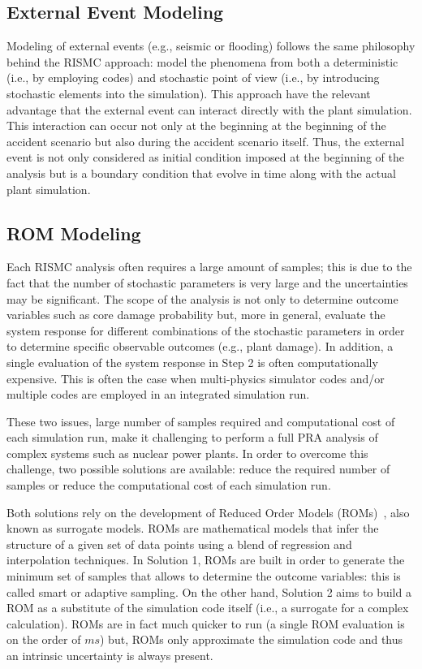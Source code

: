 \subsection{External Event Modeling}
Modeling of external events (e.g., seismic or flooding) follows the same philosophy behind the RISMC
approach: model the phenomena from both a deterministic (i.e., by employing codes) and stochastic 
point of view (i.e., by introducing stochastic elements into the simulation). This approach have the 
relevant advantage that the external event can interact directly with the plant simulation. 
This interaction can occur not only at the beginning at the beginning of the accident scenario but also
during the accident scenario itself. Thus, the external event is not only considered as initial condition
imposed at the beginning of the analysis but is a boundary condition that evolve in time along with the
actual plant simulation.

\subsection{ROM Modeling}
Each RISMC analysis often requires a large amount of samples; this is due to the fact that the 
number of stochastic parameters is very large and the uncertainties may be significant. 
The scope of the analysis is not only to determine outcome variables such as core damage probability 
but, more in general, evaluate the system response for different combinations of the stochastic
parameters in order to determine specific observable outcomes (e.g., plant damage). In addition, 
a single evaluation of the system response in Step 2 is often computationally expensive. 
This is often the case when multi-physics simulator codes and/or multiple codes are employed in an 
integrated simulation run.

These two issues, large number of samples required and computational cost of each simulation run, 
make it challenging to perform a full PRA analysis of complex systems such as nuclear power plants.  
In order to overcome this challenge, two possible solutions are available: reduce the required 
number of samples or reduce the computational cost of each simulation run.

Both solutions rely on the development of Reduced Order Models (ROMs)~\cite{ROM_Khalik}, also 
known as surrogate models. 
ROMs are mathematical models that infer the structure of a given set of data points using a
blend of regression and interpolation techniques. In Solution 1, ROMs are built in order to generate 
the minimum set of samples that allows to determine the outcome variables: this is called smart or 
adaptive sampling. On the other hand, Solution 2 aims to build a ROM as a substitute of the simulation 
code itself (i.e., a surrogate for a complex calculation).  ROMs are in fact much quicker to run 
(a single ROM evaluation is on the order of $ms$) but, ROMs only approximate the simulation code and 
thus an intrinsic uncertainty is always present.

